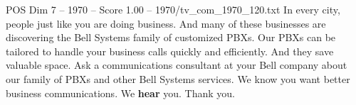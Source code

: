 \begin{textsample}{POS Dim 7 – 1970 – Score 1.00 – 1970/tv\_com\_1970\_120.txt}  \label{ex:f7_pos_036}
In every city, people just like you are doing business.
And many of these businesses are discovering the Bell Systems family of customized PBXs.
Our PBXs can be tailored to handle your business calls quickly and efficiently.
And they save valuable space.
Ask a communications consultant at your Bell company about our family of PBXs and other Bell Systems services.
We know you want better business communications.
We \textbf{hear} you.
Thank you.

\end{textsample}
